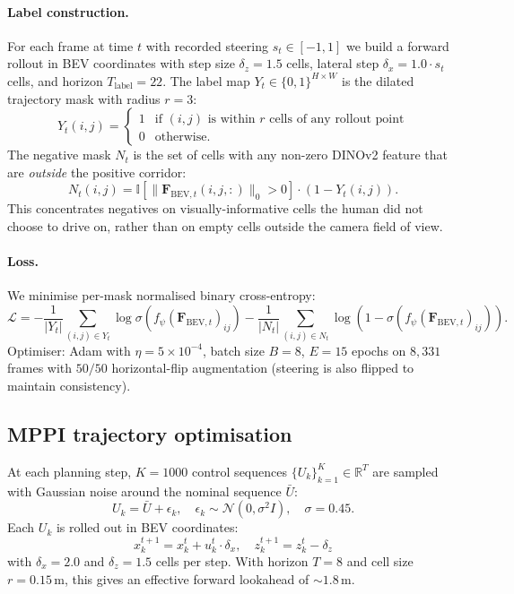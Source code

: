 \documentclass[conference]{IEEEtran}
\newcommand{\bevt}{\mathbf{F}_{\mathrm{BEV},t}}
\newcommand{\unet}{f_\psi}
\newcommand{\sigm}{\sigma}
\begin{document}
\paragraph{Label construction.}
For each frame at time $t$ with recorded steering $s_t \in [-1, 1]$ we
build a forward rollout in BEV coordinates with step size $\delta_z = 1.5$
cells, lateral step $\delta_x = 1.0 \cdot s_t$ cells, and
horizon $T_{\text{label}} = 22$. The label map $Y_t \in \{0, 1\}^{H \times W}$ is the
dilated trajectory mask with radius $r = 3$:
\begin{equation}
  Y_t(i, j) = \begin{cases}
    1 & \text{if } (i, j) \text{ is within } r \text{ cells of any rollout point} \\
    0 & \text{otherwise}.
  \end{cases}
\end{equation}
The negative mask $N_t$ is the set of cells with any non-zero DINOv2
feature that are \emph{outside} the positive corridor:
\begin{equation}
  N_t(i, j) = \mathbb{I}\left[\|\bevt(i, j, :)\|_0 > 0\right] \cdot (1 - Y_t(i, j)).
\end{equation}
This concentrates negatives on visually-informative cells the human did not
choose to drive on, rather than on empty cells outside the camera field of
view.

\paragraph{Loss.}
We minimise per-mask normalised binary cross-entropy:
\begin{equation}
  \mathcal{L} = -\frac{1}{|Y_t|} \sum_{(i,j) \in Y_t} \log \sigm(\unet(\bevt)_{ij})
              -\frac{1}{|N_t|} \sum_{(i,j) \in N_t} \log (1 - \sigm(\unet(\bevt)_{ij})).
\end{equation}
Optimiser: Adam with $\eta = 5\times10^{-4}$, batch size $B = 8$, $E = 15$
epochs on $8{,}331$ frames with $50/50$ horizontal-flip augmentation
(steering is also flipped to maintain consistency).

\subsection{MPPI trajectory optimisation}
\label{sec:mppi}

At each planning step, $K = 1000$ control sequences
$\{U_k\}_{k=1}^K \in \mathbb{R}^T$ are sampled with Gaussian noise around the
nominal sequence $\bar{U}$:
\begin{equation}
  U_k = \bar{U} + \epsilon_k, \quad \epsilon_k \sim \mathcal{N}(0, \sigma^2 I), \quad \sigma = 0.45.
\end{equation}
Each $U_k$ is rolled out in BEV coordinates:
\begin{equation}
  x^{t+1}_k = x^t_k + u_k^t \cdot \delta_x, \quad z^{t+1}_k = z^t_k - \delta_z
\end{equation}
with $\delta_x = 2.0$ and $\delta_z = 1.5$ cells per step. With horizon
$T = 8$ and cell size $r = 0.15$\,m, this gives an effective forward
lookahead of $\sim 1.8$\,m.
\end{document}

